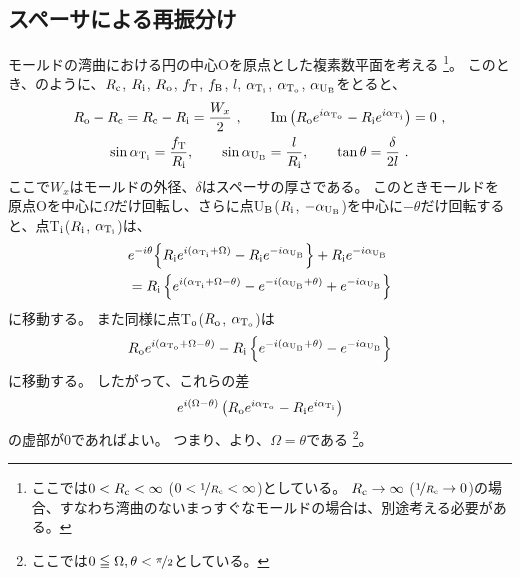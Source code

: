 \subsection{スペーサによる再振分け}
モールドの湾曲における円の中心Oを原点とした複素数平面を考える
\footnote{ここでは$0 < R_\text c < \infty$ ($0 < \nicefrac1{R_\text c} < \infty$)としている。
$R_\text c \to \infty$ ($\nicefrac1{R_\text c} \to 0$)の場合、すなわち湾曲のないまっすぐなモールドの場合は、別途考える必要がある。}。
このとき、のように、$R_\text c$, $R_\text i$, $R_\text o$, $f_\text T$, $f_\text B$, $l$, $\alpha_{\text T_\text i}$, $\alpha_{\text T_\text o}$, $\alpha_{\text U_\text B}$をとると、
\begin{subequations}
\label{eq:constraintUpoint}
\begin{gather}
  \label{eq:constraintUpoint1}
  R_\text o - R_\text c = R_\text c - R_\text i = \frac{W_x}2~, \qquad
  \text{Im}\left(R_\text oe^{i\alpha_{\text T_\text o}} - R_\text ie^{i\alpha_{\text T_\text i}}\right) = 0~,\\
  \label{eq:constraintUpoint2}
  \sin\alpha_{\text T_\text i} = \frac{f_\text T}{R_\text i}, \qquad
  \sin\alpha_{\text U_\text B} = \frac l{R_\text i}, \qquad
  \tan\theta = \frac\delta{2l}~.
\end{gather}
\end{subequations}
ここで$W_x$はモールドの外径、$\delta$はスペーサの厚さである。
このときモールドを原点Oを中心に$\Omega$だけ回転し、さらに点U$_\text B$($R_\text i$, $-\alpha_{\text U_\text B}$)を中心に$-\theta$だけ回転すると、点T$_\text i$($R_\text i$, $\alpha_{\text T_\text i}$)は、
\begin{align}
  \notag
  & e^{-i\theta}\!\left\{R_\text ie^{i(\alpha_{\text T_\text i} + \Omega)} - R_\text ie^{-i\alpha_{\text U_\text B}}\right\}
    +R_\text ie^{-i\alpha_{\text U_\text B}}\\
  &= R_\text i
     \left\{
       e^{i(\alpha_{\text T_\text i} + \Omega - \theta)} - e^{-i(\alpha_{\text U_\text B} + \theta)} + e^{-i\alpha_{\text U_\text B}}
     \right\}
  \label{eq:afterftUpoint}
\end{align}
に移動する。
また同様に点T$_\text o$($R_\text o$, $\alpha_{\text T_\text o}$)は
\begin{equation}
  \notag
  R_\text oe^{i(\alpha_{\text T_\text o} + \Omega - \theta)} - R_\text i\left\{e^{-i(\alpha_{\text U_\text B} + \theta)} - e^{-i\alpha_{\text U_\text B}}\right\}
\end{equation}
に移動する。
したがって、これらの差
\begin{equation}
  \notag
  e^{i(\Omega - \theta)}\left(R_\text oe^{i\alpha_{\text T_\text o}} - R_\text ie^{i\alpha_{\text T_\text i}}\right)
\end{equation}
の虚部が$0$であればよい。
つまり、より、$\Omega = \theta$である
\footnote{ここでは$0 \leqq \Omega, \theta < \nicefrac \pi2$としている。}。

